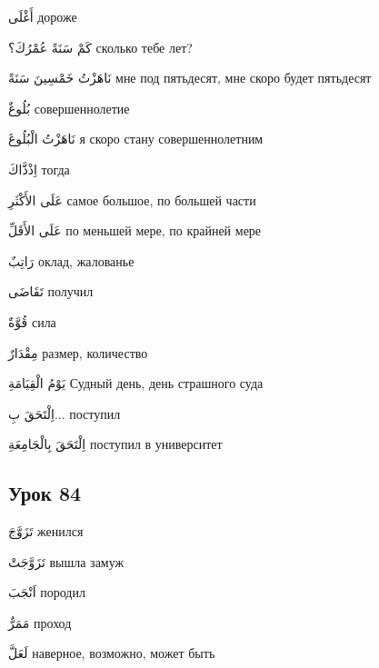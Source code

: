 \documentclass[a5paper]{article}
\newcommand\textstyleDropCaps[1]{#1}
\newcommand\textstyleCaptioncharacters[1]{#1}
\begin{document}
\textstyleCaptioncharacters{أَغْلَى }\textstyleDropCaps{дороже‎}

\textstyleCaptioncharacters{كَمْ سَنَةً عُمْرُكَ؟ }\textstyleDropCaps{сколь­ко тебе лет?‎}

\textstyleCaptioncharacters{نَاهَزْتُ خَمْسِينَ سَنَةً }\textstyleDropCaps{мне под пятьдесят, мне скоро будет пятьдесят‎}

\textstyleCaptioncharacters{بُلُوغٌ }\textstyleDropCaps{совершеннолетие‎}

\textstyleCaptioncharacters{نَاهَزْتُ الْبُلُوغَ }\textstyleDropCaps{я скоро стану совершеннолетним‎}

\textstyleCaptioncharacters{اِذْذَّاكَ }\textstyleDropCaps{тогда‎}

\textstyleCaptioncharacters{عَلَى الأَكْثَرِ }\textstyleDropCaps{самое большое, по большей части‎}

\textstyleCaptioncharacters{عَلَى الأَقَلِّ }\textstyleDropCaps{по меньшей мере, по крайней мере‎}

\textstyleCaptioncharacters{رَاتِبٌ }\textstyleDropCaps{оклад, жалованье‎}

\textstyleCaptioncharacters{تَقَاضَى }\textstyleDropCaps{получил‎}

\textstyleCaptioncharacters{قُوَّةٌ }\textstyleDropCaps{сила‎}

\textstyleCaptioncharacters{مِقْدَارٌ }\textstyleDropCaps{размер, количество‎}

\textstyleCaptioncharacters{يَوْمُ الْقِيَامَةِ }\textstyleDropCaps{Судный день, день страшного суда‎}

\textstyleCaptioncharacters{اِلْتَحَقَ بِ...ِ }\textstyleDropCaps{поступил‎}

\textstyleCaptioncharacters{اِلْتَحَقَ بِالْجَامِعَةِ }\textstyleDropCaps{посту­пил в университет‎}

\subsection[Урок 84‎]{\textstyleDropCaps{Урок 84‎}}
\textstyleCaptioncharacters{تَزَوَّجَ }\textstyleDropCaps{женился‎}

\textstyleCaptioncharacters{تَزَوَّجَتْ }\textstyleDropCaps{вышла замуж‎}

\textstyleCaptioncharacters{اَنْجَبَ }\textstyleDropCaps{породил‎}

\textstyleCaptioncharacters{مَمَرٌّ }\textstyleDropCaps{проход‎}

\textstyleCaptioncharacters{لَعَلَّ }\textstyleDropCaps{наверное, возможно, может быть‎}
\end{document}
